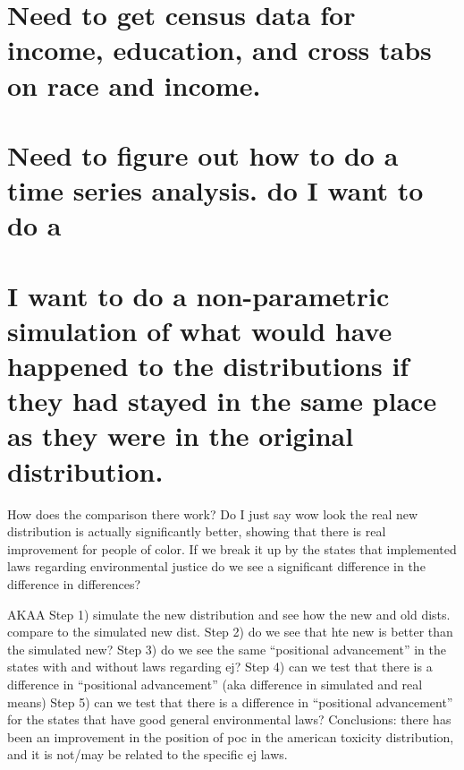 \documentclass[12pt,twoside]{dukestatscithesis}
\theoremstyle{definition}
\theoremstyle{definition}
\theoremstyle{definition}
\theoremstyle{remark}
\begin{document}
\section{Need to get census data for income, education, and cross tabs
on race and
income.}\label{need-to-get-census-data-for-income-education-and-cross-tabs-on-race-and-income.}

\section{Need to figure out how to do a time series analysis. do I want
to do
a}\label{need-to-figure-out-how-to-do-a-time-series-analysis.-do-i-want-to-do-a}

\section{I want to do a non-parametric simulation of what would have
happened to the distributions if they had stayed in the same place as
they were in the original
distribution.}\label{i-want-to-do-a-non-parametric-simulation-of-what-would-have-happened-to-the-distributions-if-they-had-stayed-in-the-same-place-as-they-were-in-the-original-distribution.}

How does the comparison there work? Do I just say wow look the real new
distribution is actually significantly better, showing that there is
real improvement for people of color. If we break it up by the states
that implemented laws regarding environmental justice do we see a
significant difference in the difference in differences?

AKAA Step 1) simulate the new distribution and see how the new and old
dists. compare to the simulated new dist. Step 2) do we see that hte new
is better than the simulated new? Step 3) do we see the same
``positional advancement'' in the states with and without laws regarding
ej? Step 4) can we test that there is a difference in ``positional
advancement'' (aka difference in simulated and real means) Step 5) can
we test that there is a difference in ``positional advancement'' for the
states that have good general environmental laws? Conclusions: there has
been an improvement in the position of poc in the american toxicity
distribution, and it is not/may be related to the specific ej laws.
\end{document}
